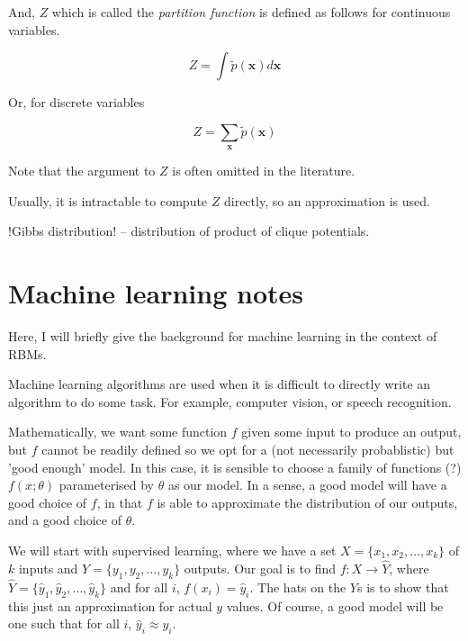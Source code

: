 \documentclass[11pt]{article}
\begin{document}
And, \(Z\) which is called the \emph{partition function} is defined as follows for continuous variables.

\begin{equation}
Z = \int \tilde{p}(\mathbf{x}) d\mathbf{x}
\end{equation}

Or, for discrete variables

\begin{equation}
Z = \sum_{\mathbf{x}} \tilde{p}(\mathbf{x})
\end{equation}

Note that the argument to \(Z\) is often omitted in the literature.

Usually, it is intractable to compute \(Z\) directly, so an approximation is used.

\begin{Notes}
!Gibbs distribution! -- distribution of product of clique potentials.
\end{Notes}

\section{Machine learning notes}
\label{sec:org7ee08dd}
Here, I will briefly give the background for machine learning in the context of RBMs.

Machine learning algorithms are used when it is difficult to directly write an algorithm to do some task. For example, computer vision, or speech recognition.


Mathematically, we want some function \(f\) given some input to produce an output, but \(f\) cannot be readily defined so we opt for a (not necessarily probablistic) but 'good enough' model. In this case, it is sensible to choose a family of functions (?) \(f ( x ; \theta )\) parameterised by \(\theta\) as our model. In a sense, a good model will have a good choice of \(f\), in that \(f\) is able to approximate the distribution of our outputs, and a good choice of \(\theta\).

We will start with supervised learning, where we have a set \(X = \{x_1, x_2, \dots, x_k \}\) of \(k\) inputs and \(Y = \{y_1, y_2, \dots, y_k\} \) outputs. Our goal is to find \(f : X \to \hat{Y}\), where \(\hat{Y} = \{ \hat{y}_1, \hat{y}_2, \dots, \hat{y}_k\}\) and for all \(i\), \( f(x_i) = \hat{y}_i \). The hats on the \(Y\)s is to show that this just an approximation for actual \(y\) values. Of course, a good model will be one such that for all \(i\), \(\hat{y}_i \approx y_i\).
\end{document}
